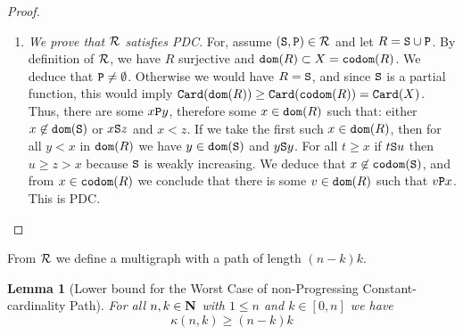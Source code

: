 \documentclass{lmcs}
\newtheorem{lemma}[theorem]{Lemma}
\begin{document}
\begin{proof}
\begin{enumerate}
\item
\emph{We prove that ${\mathcal R}$ satisfies PDC}.  
For, assume $({\tt S}, {\tt P}) \in {\mathcal R}$ and let $R = {\tt S} \cup {\tt P}$.
By definition of ${\mathcal R}$, we have $R$ surjective and ${\tt dom}(R) \subset X = {\tt codom}(R)$. 
We deduce that ${\tt P} \not = \emptyset$. Otherwise we would have $R = {\tt S}$, and
since ${\tt S}$ is a partial function, this would imply ${\tt Card}({\tt dom}(R)) \ge {\tt Card}({\tt codom}(R))
= {\tt Card}(X)$.
Thus, there are some $x {\tt P} y$, therefore some $x \in {\tt dom}(R)$ 
such that: either $x \not \in {\tt dom}({\tt S})$ or $x {\tt S} z$ and $x < z$. If we take the first such 
$x \in {\tt dom}(R)$, then for all $y < x$ in ${\tt dom}(R)$ we have $y \in {\tt dom}({\tt S})$
and $y {\tt S} y$. For all $t \ge x$
if $t {\tt S} u$ then $u \ge z > x$ because ${\tt S}$ is weakly increasing. We deduce that
$x \not \in {\tt codom}({\tt S})$, and from $x \in {\tt codom}(R)$ we conclude that
there is some $v \in {\tt dom}(R)$ such that $v {\tt P} x$. This is PDC.

\end{enumerate}
\end{proof}

From ${\mathcal R}$ we define a multigraph with a path of length $(n-k)k$.

\begin{lemma}[Lower bound for the Worst Case of 
non-Progressing Constant-cardinality Path]
For all $n,k \in {\bf N}$ with $1 \le n$ and $k \in [0,n]$ we have $$\kappa(n,k) \ge (n-k)k$$
\end{lemma}
\end{document}
